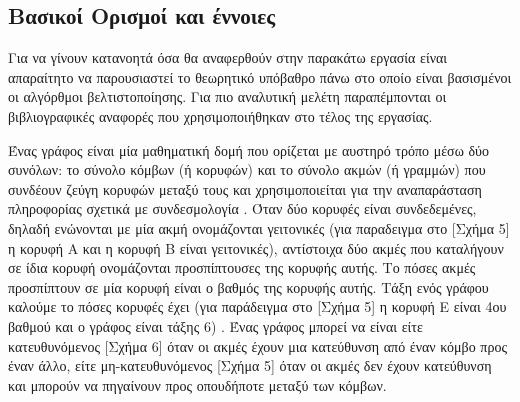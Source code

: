 \subsection{Βασικοί Ορισμοί και έννοιες}
Για να γίνουν κατανοητά όσα θα αναφερθούν στην παρακάτω εργασία είναι απαραίτητο να παρουσιαστεί το θεωρητικό υπόβαθρο πάνω στο οποίο είναι βασισμένοι οι αλγόρθμοι βελτιστοποίησης. Για πιο αναλυτική μελέτη παραπέμπονται οι βιβλιογραφικές αναφορές που χρησιμοποιήθηκαν στο τέλος της εργασίας.

Ένας γράφος είναι μία μαθηματική δομή που ορίζεται με αυστηρό τρόπο μέσω δύο συνόλων: το σύνολο κόμβων (ή κορυφών) και το σύνολο ακμών (ή γραμμών) που συνδέουν ζεύγη κορυφών μεταξύ τους και χρησιμοποιείται για την αναπαράσταση πληροφορίας σχετικά με συνδεσμολογία \cite{Ντενισιώτης}. Όταν δύο κορυφές είναι συνδεδεμένες, δηλαδή ενώνονται με μία ακμή ονομάζονται γειτονικές (για παραδειγμα στο [Σχήμα 5] η κορυφή Α και η κορυφή Β είναι γειτονικές), αντίστοιχα δύο ακμές που καταλήγουν σε ίδια κορυφή ονομάζονται προσπίπτουσες της κορυφής αυτής. Το πόσες ακμές προσπίπτουν σε μία κορυφή είναι ο βαθμός της κορυφής αυτής. Τάξη ενός γράφου καλούμε το πόσες κορυφές έχει (για παράδειγμα στο [Σχήμα 5] η κορυφή Ε είναι 4ου βαθμού και ο γράφος είναι τάξης 6) . Ένας γράφος μπορεί να είναι είτε κατευθυνόμενος [Σχήμα 6] όταν οι ακμές έχουν μια κατεύθυνση από έναν κόμβο προς έναν άλλο, είτε μη-κατευθυνόμενος [Σχήμα 5] όταν οι ακμές δεν έχουν κατεύθυνση και μπορούν να πηγαίνουν προς οπουδήποτε μεταξύ των κόμβων. 

